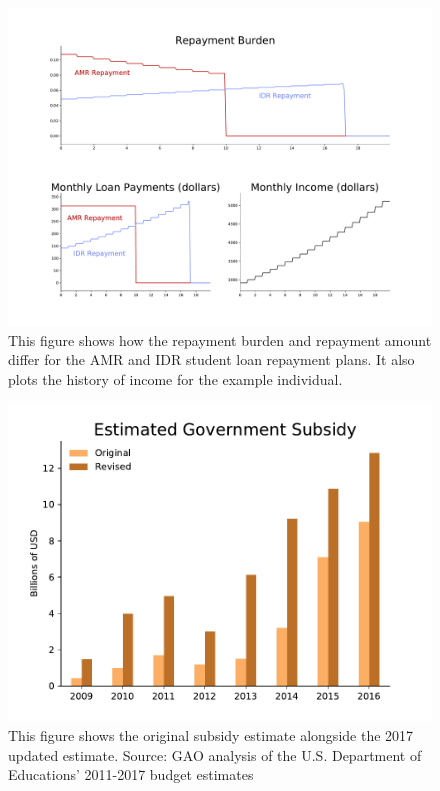   \begin{center}
    \begin{figure}[H]
      \includegraphics[width=\textwidth]{images/StudentLoans/example_loan_repayment.pdf}
      \caption{
        This figure shows how the repayment burden and repayment amount differ for the AMR
        and IDR student loan repayment plans. It also plots the history of income for the example
        individual.
      }
      \label{fig:loan_repayment}
    \end{figure}
  \end{center}

  \begin{center}
    \begin{figure}[H]
      \includegraphics[width=\textwidth]{images/StudentLoans/GovSubsidy_Original_v_Revised.pdf}
      \caption{
        This figure shows the original subsidy estimate alongside the 2017 updated estimate.
        \tiny{Source: GAO analysis of the U.S. Department of Educations' 2011-2017 budget estimates}
      }
      \label{fig:subsidy_original_v_revised}
    \end{figure}
  \end{center}


